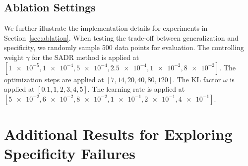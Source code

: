 \label{app:eval_metric}



\subsection{Ablation Settings}
\label{app:ablation_details}
We further illustrate the implementation details for experiments in Section~\ref{sec:ablation}. 
When testing the trade-off between generalization and specificity, we randomly sample 500 data points for evaluation. 
The controlling weight $\gamma$ for the SADR method is applied at $[\num{1e-5}, \num{1e-4}, \num{5e-4}, \num{2.5e-4}, \num{1e-2}, \num{8e-2}]$.
The optimization steps are applied at $[7, 14, 20, 40, 80, 120]$.
The KL factor $\omega$ is applied at $[0.1,1,2,3,4,5]$.
The learning rate is applied at $[\num{5e-2}, \num{6e-2}, \num{8e-2}, \num{1e-1}, \num{2e-1}, \num{4e-1}]$.


\section{Additional Results for Exploring Specificity Failures}
